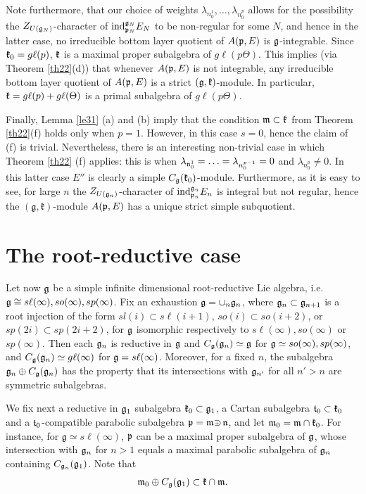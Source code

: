 \documentclass[12pt]{article}
\newcommand{\kk}{\mathfrak{k}}
\renewcommand{\gg}{\mathfrak{g}}
\newcommand{\refth}[1]{Theorem \ref{#1}}
\newcommand{\refle}[1]{Lemma \ref{#1}}
\newcommand{\gl}{{g\ell}}
\renewcommand{\sl}{{s\ell}}
\def\crplus{\hbox{$\supset${\raise1.05pt\hbox{\kern -0.72em ${\scriptscriptstyle +}$}}\ }}
\begin{document}
Note furthermore, that our choice of weights $\lambda_{n^{1}_{0}},\ldots ,\lambda_{n^{p}_{0}}$ allows for the possibility the $Z_{U(\frak g_{N})}$-character of $\text{ind}^{\frak g_{N}}_{\frak p_{N}}E_N$ to be non-regular for some $N$, and hence in the latter case, no irreducible bottom layer quotient of $A(\frak p, E)$ is $\frak g$-integrable. Since $\frak k_0 = \gl (p)$, $\frak k$ is a maximal proper subalgebra of $\gl (p\Theta)$. This implies (via \refth{th22}(d)) that whenever $A(\frak p, E)$ is not integrable, any irreducible bottom layer quotient of $A(\frak p ,E)$ is a strict $(\frak g, \frak k )$-module. In particular, $\frak k=\gl(p)+\gl(\Theta)$ is a primal subalgebra of $\gl (p\Theta)$.

Finally, \refle{le31} (a) and (b) imply that the condition $\frak m\subset\frak k$ from \refth{th22}(f) holds only when $p=1$.  However, in this case $s=0$, hence the claim of (f) is trivial.  Nevertheless, there is an interesting non-trivial case in which \refth{th22} (f) applies: this is when $\lambda_{\frak n^{1}_{0}} =\ldots = \lambda_{n^{p-1}_{0}} = 0$ and $\lambda_{n_{0}^{p}}\neq 0$.  In this latter case $E''$ is clearly a simple ${C}_{\frak g}(\frak k_0)$-module.  Furthermore, as it is easy to see, for large $n$ the $Z_{U(\frak g_{n})}$-character of $\text{ind}^{\frak g_{n}}_{\frak p_{n}} E_n$ is integral but not regular, hence the $(\gg,\kk)$-module $A(\frak p,E)$ has a unique strict simple subquotient.

\section{The root-reductive case}\label{TheRootRed}
Let now $\frak g$ be a simple infinite dimensional root-reductive Lie algebra, i.e. $\frak g\cong s\ell (\infty), so(\infty), sp(\infty)$.  Fix an exhaustion $\frak g = \cup_n \frak g_n$, where $\frak g_n\subset\frak g_{n+1}$ is a root injection of the form $sl(i)\subset s\ell (i+1)$, $so(i)\subset so(i+2)$, or $sp(2i)\subset sp(2i+2)$, for $\frak g$ isomorphic respectively to $s\ell(\infty), so(\infty)$ or $sp(\infty)$. Then each $\frak g_n$ is reductive in $\frak g$ and $C_{\frak g}(\frak g_n)\simeq \frak g$ for $\frak g \simeq so(\infty), sp(\infty)$, and $C_{\frak g}(\frak g_n)\simeq \gl (\infty)$ for $\frak g = s\ell (\infty)$.  Moreover, for a fixed $n$, the subalgebra $\frak g_n \oplus C_{\frak g}(\frak g_n)$ has the property that its intersections with $\frak g_{n'}$ for all $n' > n$ are symmetric subalgebras. 

We fix next a reductive in $\frak g_1$ subalgebra $\frak k_0\subset\gg_1$, a Cartan subalgebra $\frak t_0\subset \frak k_0$ and a $\frak t_0$-compatible parabolic subalgebra $\frak p = \frak m\crplus\frak n$, and let $\frak m_0 = \frak m\cap\frak k_0$.  For instance, for $\gg\simeq\sl(\infty)$, $\frak p$ can be a maximal proper subalgebra of $\frak g$, whose intersection with $\frak g_n$ for $n> 1$ equals a maximal parabolic subalgebra of $\frak g_n$ containing $C_{\frak g_{n}}(\frak g_1)$. Note that
\begin{equation}\label{eq9}
\frak m_0\oplus C_{\frak  g} (\frak g_1)\subset \frak k\cap \frak m.
\end{equation}
\end{document}
